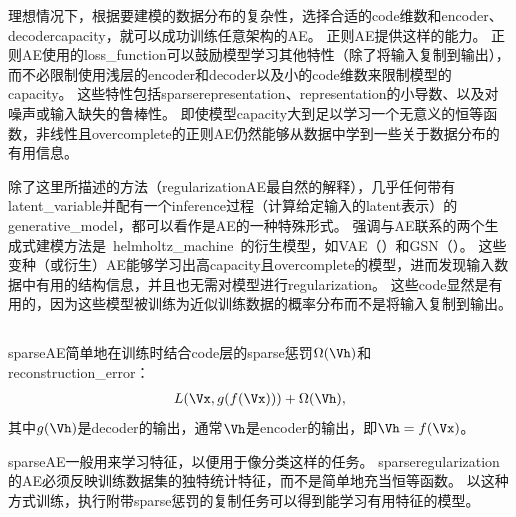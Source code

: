 理想情况下，根据要建模的数据分布的复杂性，选择合适的\gls{code}维数和\gls{encoder}、\gls{decoder}\gls{capacity}，就可以成功训练任意架构的\gls{AE}。
正则\gls{AE}提供这样的能力。
正则\gls{AE}使用的\gls{loss_function}可以鼓励模型学习其他特性（除了将输入复制到输出），而不必限制使用浅层的\gls{encoder}和\gls{decoder}以及小的\gls{code}维数来限制模型的\gls{capacity}。
这些特性包括\gls{sparse}\gls{representation}、\gls{representation}的小导数、以及对噪声或输入缺失的鲁棒性。
即使模型\gls{capacity}大到足以学习一个无意义的恒等函数，非线性且\gls{overcomplete}的正则\gls{AE}仍然能够从数据中学到一些关于数据分布的有用信息。


除了这里所描述的方法（\gls{regularization}\gls{AE}最自然的解释），几乎任何带有\gls{latent_variable}并配有一个\gls{inference}过程（计算给定输入的\gls{latent}表示）的\gls{generative_model}，都可以看作是\gls{AE}的一种特殊形式。
强调与\gls{AE}联系的两个生成式建模方法是~\gls{helmholtz_machine}~\citep{Hinton95}的衍生模型，如\gls{VAE}（）和\gls{GSN}（）。
这些变种（或衍生）\gls{AE}能够学习出高\gls{capacity}且\gls{overcomplete}的模型，进而发现输入数据中有用的结构信息，并且也无需对模型进行\gls{regularization}。
这些\gls{code}显然是有用的，因为这些模型被训练为近似训练数据的概率分布而不是将输入复制到输出。 %


\subsection{}
\label{sec:sparse_autoencoders}
\gls{sparse}\gls{AE}简单地在训练时结合\gls{code}层的\gls{sparse}惩罚$\Omega(\Vh)$和\gls{reconstruction_error}：
\begin{align}
    L(\Vx, g(f(\Vx))) + \Omega(\Vh),
\end{align}
其中$g(\Vh)$是\gls{decoder}的输出，通常$\Vh$是\gls{encoder}的输出，即$\Vh = f(\Vx)$。


\gls{sparse}\gls{AE}一般用来学习特征，以便用于像分类这样的任务。
\gls{sparse}\gls{regularization}的\gls{AE}必须反映训练数据集的独特统计特征，而不是简单地充当恒等函数。
以这种方式训练，执行附带\gls{sparse}惩罚的复制任务可以得到能学习有用特征的模型。



